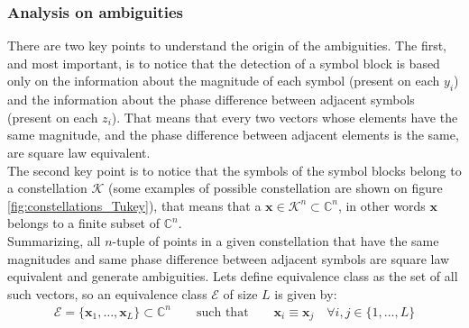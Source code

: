 \subsubsection{Analysis on ambiguities}
\label{sec:ambiguities}

There are two key points to understand the origin of the ambiguities. The first, and most important, is to notice that the detection of a symbol block is based only on the information about the magnitude of each symbol (present on each $y_i$) and the information about the phase difference between adjacent symbols (present on each $z_i$). That means that every two vectors whose elements have the same magnitude, and the phase difference between adjacent elements is the same, are square law equivalent.\\

The second key point is to notice that the symbols of the symbol blocks belong to a constellation $\mathcal K$ (some examples of possible constellation are shown on figure \ref{fig:constellations_Tukey}), that means that a $\bm x\in \mathcal K^n \subset\mathds{C}^n$, in other words $\bm x$ belongs to a finite subset of $\mathds{C}^n$.\\

Summarizing, all $n$-tuple of points in a given constellation that have the same magnitudes and same phase difference between adjacent symbols are square law equivalent and generate ambiguities. Lets define equivalence class as the set of all such vectors, so an equivalence class $\mathcal{E}$ of size $L$ is given by:
\begin{align}
	\mathcal E=\{\bm x_1, \dotsc,\bm x_L\} \subset\mathds C^n\qquad \text{such that}\qquad\bm x_i\equiv\bm x_j\quad \forall i,j \in \{1,\dotsc,L\} 
\end{align}



